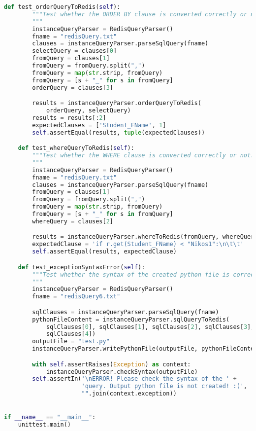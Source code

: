 \documentclass[11pt]{article}
\begin{document}
\begin{lstlisting}[language=Python]
    def test_orderQueryToRedis(self):
        """Test whether the ORDER BY clause is converted correctly or not.
        """
        instanceQueryParser = RedisQueryParser()
        fname = "redisQuery.txt"
        clauses = instanceQueryParser.parseSqlQuery(fname)
        selectQuery = clauses[0]
        fromQuery = clauses[1]
        fromQuery = fromQuery.split(",")
        fromQuery = map(str.strip, fromQuery)
        fromQuery = [s + "_" for s in fromQuery]
        orderQuery = clauses[3]

        results = instanceQueryParser.orderQueryToRedis(
            orderQuery, selectQuery)
        results = results[:2]
        expectedClauses = ['Student_FName', 1]
        self.assertEqual(results, tuple(expectedClauses))

    def test_whereQueryToRedis(self):
        """Test whether the WHERE clause is converted correctly or not.
        """
        instanceQueryParser = RedisQueryParser()
        fname = "redisQuery.txt"
        clauses = instanceQueryParser.parseSqlQuery(fname)
        fromQuery = clauses[1]
        fromQuery = fromQuery.split(",")
        fromQuery = map(str.strip, fromQuery)
        fromQuery = [s + "_" for s in fromQuery]
        whereQuery = clauses[2]

        results = instanceQueryParser.whereToRedis(fromQuery, whereQuery)
        expectedClause = 'if r.get(Student_FName) < "Nikos1":\n\t\t'
        self.assertEqual(results, expectedClause)

    def test_exceptionSyntaxError(self):
        """Test whether the syntax of the created python file is correct.
        """
        instanceQueryParser = RedisQueryParser()
        fname = "redisQuery6.txt"

        sqlClauses = instanceQueryParser.parseSqlQuery(fname)
        pythonFileContent = instanceQueryParser.sqlQueryToRedis(
            sqlClauses[0], sqlClauses[1], sqlClauses[2], sqlClauses[3],
            sqlClauses[4])
        outputFile = "test.py"
        instanceQueryParser.writePythonFile(outputFile, pythonFileContent)

        with self.assertRaises(Exception) as context:
            instanceQueryParser.checkSyntax(outputFile)
        self.assertIn('\nERROR! Please check the syntax of the ' +
                      'query. Output python file is not created! :(',
                      "".join(context.exception))


if __name__ == "__main__":
    unittest.main()

\end{lstlisting}
{} 
\end{document}
